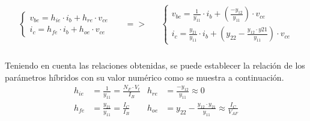 \[
\begin{array}{rcl} 
      \begin{array}{l}
	 \begin{cases}
	    v_{be} = h_{ie} \cdot i_b + h_{re} \cdot v_{ce} \\
	    i_c = h_{fe} \cdot i_b + h_{oe} \cdot v_{ce}
	 \end{cases}
      \end{array}
      &
      \begin{array}{l}
	  =>
      \end{array}
      &
      \begin{array}{l}
	 \begin{cases}
	    v_{be} = \frac{1}{y_{11}} \cdot i_b + \left(\frac{-y_{12}}{y_{11}}\right) \cdot v_{ce} \\
	    i_c = \frac{y_{21}}{y_{11}} \cdot i_b + \left( y_{22} - \frac{y_{12} \cdot y{21}}{y_{11}}\right) \cdot v_{ce} 
	 \end{cases}
      \end{array}
\end{array}
\]

\paragraph{}
Teniendo en cuenta las relaciones obtenidas, se puede establecer la relación de los parámetros híbridos con su valor numérico como se muestra a continuación.
\begin{align*} 
   h_{ie} &= \frac { 1 }{ y_{11} } = \frac{N_F \cdot V_t}{I_B} & h_{re} &= \frac{-y_{12}}{y_{11}} \approx 0 \\
   h_{fe} &= \frac { y_{21} }{ y_{11} } = \frac{I_C}{I_B} & h_{oe} &=  y_{22} - \frac{y_{12} \cdot y_{21}}{y_{11}}\approx \frac{I_C}{V_{AF}}
\end{align*}

